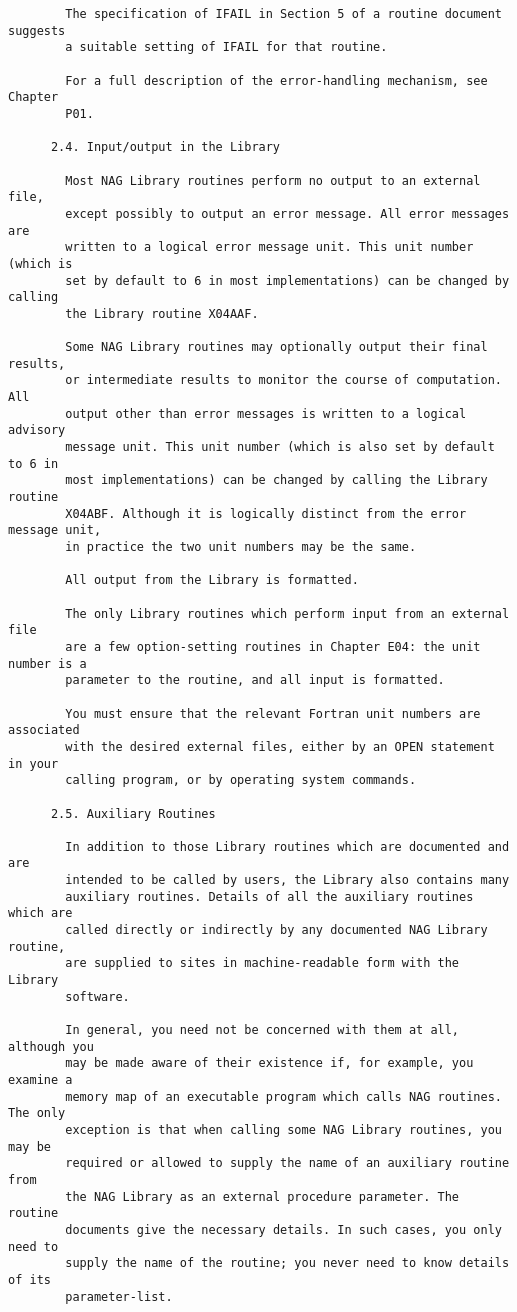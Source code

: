 \begin{small}
\begin{verbatim}
        The specification of IFAIL in Section 5 of a routine document suggests
        a suitable setting of IFAIL for that routine.

        For a full description of the error-handling mechanism, see Chapter
        P01.

      2.4. Input/output in the Library

        Most NAG Library routines perform no output to an external file,
        except possibly to output an error message. All error messages are
        written to a logical error message unit. This unit number (which is
        set by default to 6 in most implementations) can be changed by calling
        the Library routine X04AAF.

        Some NAG Library routines may optionally output their final results,
        or intermediate results to monitor the course of computation. All
        output other than error messages is written to a logical advisory
        message unit. This unit number (which is also set by default to 6 in
        most implementations) can be changed by calling the Library routine
        X04ABF. Although it is logically distinct from the error message unit,
        in practice the two unit numbers may be the same.

        All output from the Library is formatted.

        The only Library routines which perform input from an external file
        are a few option-setting routines in Chapter E04: the unit number is a
        parameter to the routine, and all input is formatted.

        You must ensure that the relevant Fortran unit numbers are associated
        with the desired external files, either by an OPEN statement in your
        calling program, or by operating system commands.

      2.5. Auxiliary Routines

        In addition to those Library routines which are documented and are
        intended to be called by users, the Library also contains many
        auxiliary routines. Details of all the auxiliary routines which are
        called directly or indirectly by any documented NAG Library routine,
        are supplied to sites in machine-readable form with the Library
        software.

        In general, you need not be concerned with them at all, although you
        may be made aware of their existence if, for example, you examine a
        memory map of an executable program which calls NAG routines. The only
        exception is that when calling some NAG Library routines, you may be
        required or allowed to supply the name of an auxiliary routine from
        the NAG Library as an external procedure parameter. The routine
        documents give the necessary details. In such cases, you only need to
        supply the name of the routine; you never need to know details of its
        parameter-list.


\end{verbatim}
\end{small}
